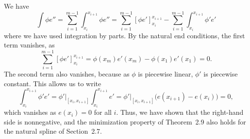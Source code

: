 \begin{solution}
    We have
    \begin{equation*}
        \int \phi e''
        = \sum_{i=1}^{m-1} \int_{x_i}^{x_{i+1}} \phi e''
        = \sum_{i=1}^{m-1} \left[ \phi e' \right]_{x_i}^{x_{i+1}} - \sum_{i=1}^{m-1} \int_{x_i}^{x_{i+1}} \phi' e'
    \end{equation*}
    where we have used integration by parts.
    By the natural end conditions, the first term vanishes, as
    \begin{equation*}
        \sum_{i = 1}^{m - 1} \left[ \phi e' \right]_{x_i}^{x_{i+1}} = \phi(x_m) e'(x_m) - \phi(x_1) e'(x_1) = 0.
    \end{equation*}
    The second term also vanishes, because as $\phi$ is piecewise linear, $\phi'$ is piecewise constant.
    This allows us to write
    \begin{equation*}
        \int_{x_i}^{x_{i+1}} \phi' e' = \phi'\Big|_{[x_i, x_{i+1}]} \int_{x_i}^{x_{i+1}} e' = \phi'\Big|_{[x_i, x_{i+1}]} \Big( e(x_{i+1}) - e(x_i) \Big) = 0,
    \end{equation*}
    which vanishes as $e(x_i) = 0$ for all $i$.
    Thus, we have shown that the right-hand side is nonnegative, and the minimization property of Theorem~2.9 also holds for the natural spline of Section~2.7.
\end{solution}